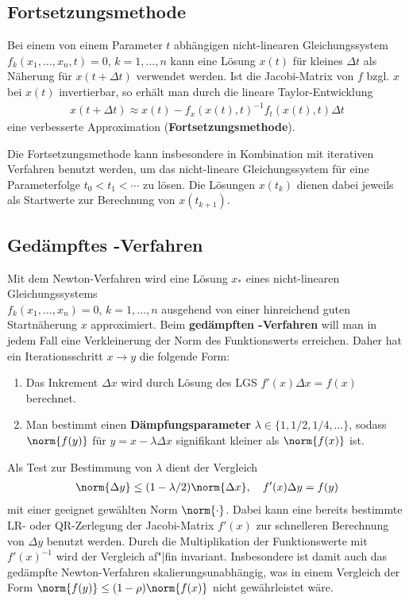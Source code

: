 \pagebreak

\subsection{%
    Fortsetzungsmethode%
}

Bei einem von einem Parameter $t$ abhängigen nicht-linearen Gleichungssystem \\
$f_k(x_1, \dotsc, x_n, t) = 0$, $k = 1, \dotsc, n$
kann eine Lösung $x(t)$ für kleines $\Delta t$ als Näherung für
$x(t + \Delta t)$ verwendet werden.
Ist die Jacobi-Matrix von $f$ bzgl. $x$ bei $x(t)$ invertierbar,
so erhält man durch die lineare Taylor-Entwicklung
\begin{align*}
    x(t + \Delta t) \approx x(t) - f_x(x(t), t)^{-1} f_t(x(t), t) \Delta t
\end{align*}
eine verbesserte Approximation (\textbf{Fortsetzungsmethode}).

Die Fortsetzungsmethode kann insbesondere in Kombination mit iterativen
Verfahren benutzt werden, um das nicht-lineare Gleichungssystem für eine
Parameterfolge $t_0 < t_1 < \dotsb$ zu lösen.
Die Lösungen $x(t_k)$ dienen dabei jeweils als Startwerte zur Berechnung
von $x(t_{k+1})$.

\subsection{%
    Gedämpftes -Verfahren%
}

Mit dem Newton-Verfahren wird eine Lösung $x_\ast$ eines nicht-linearen
Gleichungssystems \\
$f_k(x_1, \dotsc, x_n) = 0$, $k = 1, \dotsc, n$
ausgehend von einer hinreichend guten Startnäherung $x$ approximiert.
Beim \textbf{gedämpften -Verfahren} will man in jedem Fall eine
Verkleinerung der Norm des Funktionswerts erreichen.
Daher hat ein Iterationsschritt $x \rightarrow y$ die folgende Form:
\begin{enumerate}
    \item
    Das Inkrement $\Delta x$ wird durch Lösung des LGS
    $f'(x) \Delta x = f(x)$ berechnet.

    \item
    Man bestimmt einen \textbf{Dämpfungsparameter}
    $\lambda \in \{1, 1/2, 1/4, \dotsc\}$, sodass $\norm{f(y)}$
    für $y = x - \lambda \Delta x$ signifikant kleiner als $\norm{f(x)}$ ist.
\end{enumerate}

Als Test zur Bestimmung von $\lambda$ dient der Vergleich
\begin{align*}
    \norm{\Delta y} \le (1 - \lambda/2) \norm{\Delta x}, \quad
    f'(x) \Delta y = f(y)
\end{align*}
mit einer geeignet gewählten Norm $\norm{\cdot}$.
Dabei kann eine bereits bestimmte LR- oder QR-Zerlegung der Jacobi-Matrix
$f'(x)$ zur schnelleren Berechnung von $\Delta y$ benutzt werden.
Durch die Multiplikation der Funktionswerte mit $f'(x)^{-1}$ wird der Vergleich
af"|fin invariant.
Insbesondere ist damit auch das gedämpfte Newton-Verfahren
skalierungsunabhängig, was in einem Vergleich der Form
$\norm{f(y)} \le (1 - \rho) \norm{f(x)}$ nicht gewährleistet wäre.

